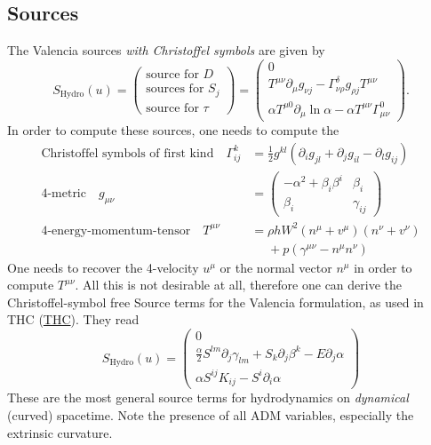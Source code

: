 \documentclass[a4paper]{article}
\newcommand{\desc}[1]{\text{#1}\quad}
\newcommand{\hydro}{\text{Hydro}}
\begin{document}
\subsection{Sources}
The Valencia sources \emph{with Christoffel symbols} are given by
\begin{equation}
S_\hydro(u) =
\begin{pmatrix}
\text{source for } D \\
\text{sources for } S_j \\
\text{source for } \tau
\end{pmatrix}
=
\begin{pmatrix}
0
\\
T^{\mu\nu} \partial_\mu g_{\nu j} - \Gamma^\delta_{\nu\rho} g_{\rho j} T^{\mu\nu}
\\
\alpha T^{\mu 0} \partial_\mu \ln \alpha - \alpha T^{\mu\nu} \Gamma^0_{\mu\nu}
\end{pmatrix}.
\end{equation}
In order to compute these sources, one needs to compute the
\begin{align}
\desc{Christoffel symbols of first kind} \Gamma^k_{ij}
&= \frac{1}{2} g^{kl} \left(\partial_i g_{jl} + \partial_j g_{il} - \partial_l g_{ij}\right)
\\
\desc{4-metric}
g_{\mu\nu} &= 
\begin{pmatrix}
-\alpha^2 + \beta_i \beta^i  & \beta_i \\
\beta_i                      & \gamma_{ij}
\end{pmatrix}
\\
\desc{4-energy-momentum-tensor}
T^{\mu\nu} &=
\rho h W^2 (n^\mu + v^\mu) (n^\nu + v^\nu)
\\ &\phantom{=} + p(\gamma^{\mu\nu} - n^\mu n^\nu)
\end{align}
One needs to recover the 4-velocity $u^\mu$ or the normal vector
$n^\mu$ in order to compute $T^{\mu\nu}$. All this is not desirable
at all, therefore one can derive the Christoffel-symbol free Source
terms for the Valencia formulation, as used in THC
(\href{https://arxiv.org/abs/1312.5004}{THC}). They read
\begin{equation}
S_\hydro(u) =
\begin{pmatrix}
0
\\
\frac \alpha2 S^{lm} \partial_j \gamma_{lm} + S_k \partial_j \beta^k - E \partial_j \alpha
\\
\alpha S^{ij} K_{ij} - S^i \partial_i \alpha
\end{pmatrix}
\end{equation}
These are the most general source terms for hydrodynamics on
\emph{dynamical} (curved) spacetime. Note the presence of all ADM
variables, especially the extrinsic curvature.
\end{document}
